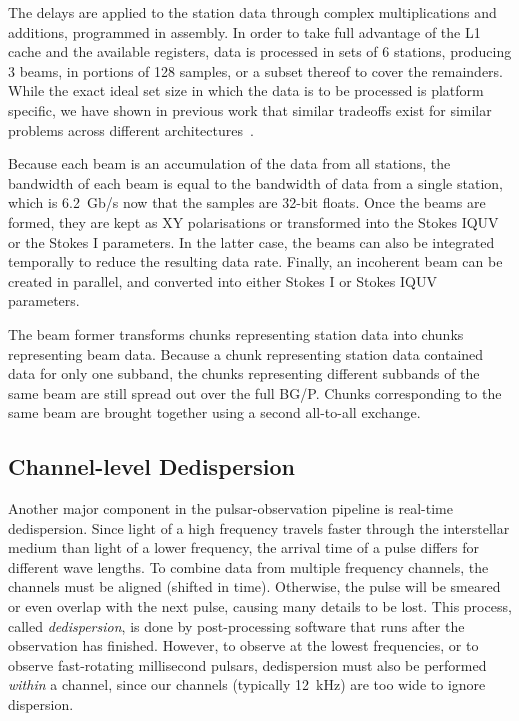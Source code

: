 \documentclass{llncs}
\begin{document}
The delays are applied to the station data through complex multiplications and additions, programmed in assembly. In order to take full advantage of the L1 cache and the available registers, data is processed in sets of 6 stations, producing 3 beams, in portions of 128 samples, or a subset thereof to cover the remainders. While the exact ideal set size in which the data is to be processed is platform specific, we have shown in previous work that similar tradeoffs exist for similar problems across different architectures~\cite{Nieuwpoort:09}.

Because each beam is an accumulation of the data from all stations, the bandwidth of each beam is equal to the bandwidth of data from a single station, which is 6.2~Gb/s now that the samples are 32-bit floats. Once the beams are formed, they are kept as XY polarisations or transformed into the Stokes IQUV or the Stokes I parameters. In the latter case, the beams can also be integrated temporally to reduce the resulting data rate. Finally, an incoherent beam can be created in parallel, and converted into either Stokes I or Stokes IQUV parameters.

The beam former transforms chunks representing station data into chunks representing beam data. Because a chunk representing station data contained data for only one subband, the chunks representing different subbands of the same beam are still spread out over the full BG/P. Chunks corresponding to the same beam are brought together using a second all-to-all exchange.

\subsection{Channel-level Dedispersion}

Another major component in the pulsar-observation pipeline is real-time dedispersion.  Since light of a high frequency travels faster through the interstellar medium than light of a lower frequency, the arrival time of a pulse differs for different wave lengths. To combine data from multiple frequency channels, the channels must be aligned (shifted in time). Otherwise, the pulse will be smeared or even overlap with the next pulse, causing many details to be lost. This process, called \emph{dedispersion}, is done by post-processing software that runs after the observation has finished.  However, to observe at the lowest frequencies, or to observe fast-rotating millisecond pulsars, dedispersion must also be performed \emph{within\/} a channel, since our channels (typically 12~kHz) are too wide to ignore dispersion.
\end{document}
